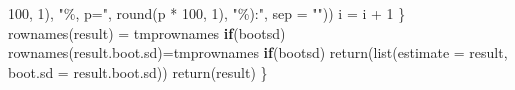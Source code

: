 \documentclass[
]{article}
\newenvironment{Shaded}{\begin{snugshade}}{\end{snugshade}}
\newcommand{\AttributeTok}[1]{\textcolor[rgb]{0.77,0.63,0.00}{#1}}
\newcommand{\ControlFlowTok}[1]{\textcolor[rgb]{0.13,0.29,0.53}{\textbf{#1}}}
\newcommand{\DecValTok}[1]{\textcolor[rgb]{0.00,0.00,0.81}{#1}}
\newcommand{\FunctionTok}[1]{\textcolor[rgb]{0.00,0.00,0.00}{#1}}
\newcommand{\NormalTok}[1]{#1}
\newcommand{\OtherTok}[1]{\textcolor[rgb]{0.56,0.35,0.01}{#1}}
\newcommand{\SpecialCharTok}[1]{\textcolor[rgb]{0.00,0.00,0.00}{#1}}
\newcommand{\StringTok}[1]{\textcolor[rgb]{0.31,0.60,0.02}{#1}}
\begin{document}
\begin{Shaded}
\begin{Highlighting}[]
                                        \DecValTok{100}\NormalTok{, }\DecValTok{1}\NormalTok{), }\StringTok{"\%, p="}\NormalTok{, }\FunctionTok{round}\NormalTok{(p }\SpecialCharTok{*} \DecValTok{100}\NormalTok{, }\DecValTok{1}\NormalTok{), }\StringTok{"\%):"}\NormalTok{, }\AttributeTok{sep =} \StringTok{""}\NormalTok{))}
\NormalTok{        i }\OtherTok{=}\NormalTok{ i }\SpecialCharTok{+} \DecValTok{1}
\NormalTok{    \}}
    \FunctionTok{rownames}\NormalTok{(result) }\OtherTok{=}\NormalTok{ tmprownames}
    \ControlFlowTok{if}\NormalTok{(bootsd)}
        \FunctionTok{rownames}\NormalTok{(result.boot.sd)}\OtherTok{=}\NormalTok{tmprownames}
    \ControlFlowTok{if}\NormalTok{(bootsd) }
        \FunctionTok{return}\NormalTok{(}\FunctionTok{list}\NormalTok{(}\AttributeTok{estimate =}\NormalTok{ result, }\AttributeTok{boot.sd =}\NormalTok{ result.boot.sd))}
    \FunctionTok{return}\NormalTok{(result)}
\NormalTok{\}}




\end{Highlighting}
\end{Shaded}
\end{document}
